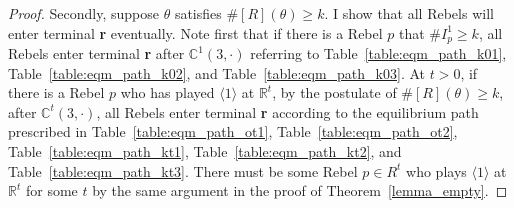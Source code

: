 \documentclass[12pt,letter]{article}
\newcommand{\Kappa}{\mathbb{C}}
\newcommand{\Omicron}{\mathbb{R}}
\theoremstyle{definition}
\theoremstyle{definition}
\theoremstyle{remark}
\theoremstyle{claim}
\begin{document}
\begin{proof}
Secondly, suppose $\theta$ satisfies $\#[R](\theta)\geq k$. I show that all Rebels will enter terminal \textbf{r} eventually. Note first that if there is a Rebel $p$ that $\#I^1_p\geq k$, all Rebels enter terminal \textbf{r} after $\Kappa^1(3,\cdot)$ referring to Table~\ref{table:eqm_path_k01}, Table~\ref{table:eqm_path_k02}, and Table~\ref{table:eqm_path_k03}. At $t>0$, if there is a Rebel $p$ who has played $\langle 1 \rangle$ at $\Omicron^t$, by the postulate of $\#[R](\theta)\geq k$, after $\Kappa^t(3,\cdot)$, all Rebels enter terminal \textbf{r} according to the equilibrium path prescribed in Table~\ref{table:eqm_path_ot1}, Table~\ref{table:eqm_path_ot2}, Table~\ref{table:eqm_path_kt1}, Table~\ref{table:eqm_path_kt2}, and Table~\ref{table:eqm_path_kt3}. There must be some Rebel $p\in R^t$ who plays $\langle 1 \rangle$ at $\Omicron^t$ for some $t$ by the same argument in the proof of Theorem~\ref{lemma_empty}.
\end{proof}
\end{document}
